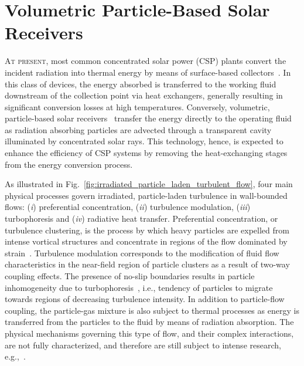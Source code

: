 \chapter{Volumetric Particle-Based Solar Receivers}\label{chap:psaap}

\lettrine{A}{t present,} most common concentrated solar power (CSP) plants convert the incident radiation into thermal energy by means of surface-based collectors~\citep{Ho2014-A}.
In this class of devices, the energy absorbed is transferred to the working fluid downstream of the collection point via heat exchangers, generally resulting in significant conversion losses at high temperatures.
Conversely, volumetric, particle-based solar receivers~\citep{Ho2017-A} transfer the energy directly to the operating fluid as radiation absorbing particles are advected through a transparent cavity illuminated by concentrated solar rays.
This technology, hence, is expected to enhance the efficiency of CSP systems by removing the heat-exchanging stages from the energy conversion process.

As illustrated in Fig.~\ref{fig:irradiated_particle_laden_turbulent_flow}, four main physical processes govern irradiated, particle-laden turbulence in wall-bounded flows: (\emph{i}) preferential concentration, (\emph{ii}) turbulence modulation, (\emph{iii}) turbophoresis and (\emph{iv}) radiative heat transfer.
Preferential concentration, or turbulence clustering, is the process by which heavy particles are expelled from intense vortical structures and concentrate in regions of the flow dominated by strain~\citep{Balachandar2010-A}.
Turbulence modulation corresponds to the modification of fluid flow characteristics in the near-field region of particle clusters as a result of two-way coupling effects.
The presence of no-slip boundaries results in particle inhomogeneity due to turbophoresis~\citep{Caporaloni1975-A}, i.e., tendency of particles to migrate towards regions of decreasing turbulence intensity.
In addition to particle-flow coupling, the particle-gas mixture is also subject to thermal processes as energy is transferred from the particles to the fluid by means of radiation absorption.
The physical mechanisms governing this type of flow, and their complex interactions, are not fully characterized, and therefore are still subject to intense research, e.g.,~\citep{Zamansky2014-A,Frankel2016-A,Pouransari2017-A}.

